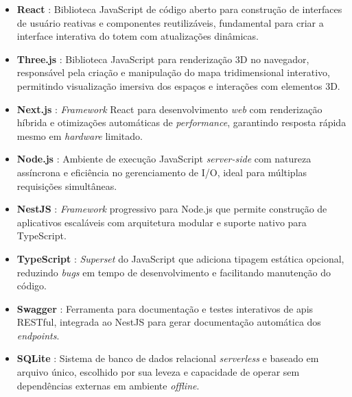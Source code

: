 \begin{itemize}
    \item \textbf{React} \parencite{react}: Biblioteca JavaScript de código aberto para construção de interfaces de usuário reativas e componentes reutilizáveis, fundamental para criar a interface interativa do totem com atualizações dinâmicas.
    \item \textbf{Three.js} \parencite{threejs}: Biblioteca JavaScript para renderização 3D no navegador, responsável pela criação e manipulação do mapa tridimensional interativo, permitindo visualização imersiva dos espaços e interações com elementos 3D.
    \item \textbf{Next.js} \parencite{nextjs}: \textit{Framework} React para desenvolvimento \textit{web} com renderização híbrida e otimizações automáticas de \textit{performance}, garantindo resposta rápida mesmo em \textit{hardware} limitado.
    \item \textbf{Node.js} \parencite{nodejs}: Ambiente de execução JavaScript \textit{server-side} com natureza assíncrona e eficiência no gerenciamento de I/O, ideal para múltiplas requisições simultâneas.
    \item \textbf{NestJS} \parencite{nestjs}: \textit{Framework} progressivo para Node.js que permite construção de aplicativos escaláveis com arquitetura modular e suporte nativo para TypeScript.
    \item \textbf{TypeScript} \parencite{typescript}: \textit{Superset} do JavaScript que adiciona tipagem estática opcional, reduzindo \textit{bugs} em tempo de desenvolvimento e facilitando manutenção do código.
    \item \textbf{Swagger} \parencite{swagger}: Ferramenta para documentação e testes interativos de \acp{api} RESTful, integrada ao NestJS para gerar documentação automática dos \textit{endpoints}.
    \item \textbf{SQLite} \parencite{sqlite}: Sistema de banco de dados relacional \textit{serverless} e baseado em arquivo único, escolhido por sua leveza e capacidade de operar sem dependências externas em ambiente \textit{offline}.
\end{itemize}
